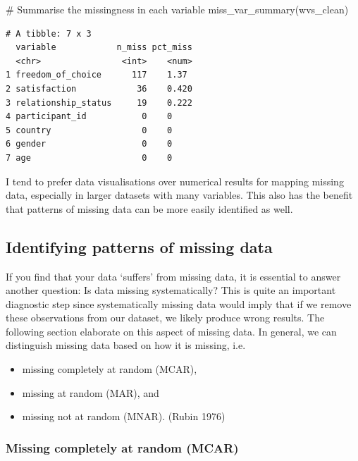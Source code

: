\documentclass[
  letterpaper,
]{krantz}
\makeatletter
\newenvironment{Shaded}{\begin{snugshade}}{\end{snugshade}}
\newcommand{\CommentTok}[1]{\textcolor[rgb]{0.37,0.37,0.37}{#1}}
\newcommand{\FunctionTok}[1]{\textcolor[rgb]{0.28,0.35,0.67}{#1}}
\newcommand{\NormalTok}[1]{\textcolor[rgb]{0.00,0.23,0.31}{#1}}
\newenvironment{kframe}{%
\medskip{}
\setlength{\fboxsep}{.8em}
 \def\at@end@of@kframe{}%
 \ifinner\ifhmode%
  \def\at@end@of@kframe{\end{minipage}}%
  \begin{minipage}{\columnwidth}%
 \fi\fi%
 \def\FrameCommand##1{\hskip\@totalleftmargin \hskip-\fboxsep
 \colorbox{shadecolor}{##1}\hskip-\fboxsep
     \hskip-\linewidth \hskip-\@totalleftmargin \hskip\columnwidth}%
 \MakeFramed {\advance\hsize-\width
   \@totalleftmargin\z@ \linewidth\hsize
   \@setminipage}}%
 {\par\unskip\endMakeFramed%
 \at@end@of@kframe}
\renewenvironment{Shaded}{\begin{kframe}}{\end{kframe}}
\makeatother
\begin{document}
\begin{Shaded}
\begin{Highlighting}[]
\CommentTok{\# Summarise the missingness in each variable}
\FunctionTok{miss\_var\_summary}\NormalTok{(wvs\_clean)}
\end{Highlighting}
\end{Shaded}

\begin{verbatim}
# A tibble: 7 x 3
  variable            n_miss pct_miss
  <chr>                <int>    <num>
1 freedom_of_choice      117    1.37 
2 satisfaction            36    0.420
3 relationship_status     19    0.222
4 participant_id           0    0    
5 country                  0    0    
6 gender                   0    0    
7 age                      0    0    
\end{verbatim}

I tend to prefer data visualisations over numerical results for mapping
missing data, especially in larger datasets with many variables. This
also has the benefit that patterns of missing data can be more easily
identified as well.

\subsection{Identifying patterns of missing
data}\label{sec-patterns-of-missing-data}

If you find that your data `suffers' from missing data, it is essential
to answer another question: Is data missing systematically? This is
quite an important diagnostic step since systematically missing data
would imply that if we remove these observations from our dataset, we
likely produce wrong results. The following section elaborate on this
aspect of missing data. In general, we can distinguish missing data
based on how it is missing, i.e.

\begin{itemize}
\item
  missing completely at random (MCAR),
\item
  missing at random (MAR), and
\item
  missing not at random (MNAR). (Rubin 1976)
\end{itemize}

\subsubsection{Missing completely at random
(MCAR)}\label{sec-missing-completetly-at-random-mcar}
\end{document}
